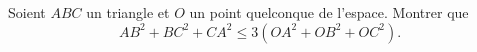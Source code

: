 Soient $ABC$ un triangle et $O$ un point quelconque de l'espace. Montrer que
\[ AB^2 + BC^2 + CA^2 \leq 3\left(OA^2 + OB^2 + OC^2\right). \]
